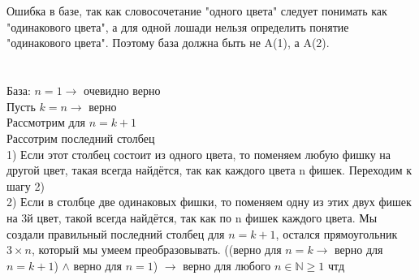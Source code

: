 \documentclass{article}
\begin{document}
\section{}

Ошибка в базе, так как словосочетание "одного цвета" следует понимать как "одинакового цвета", а для одной лошади нельзя определить понятие "одинакового цвета". Поэтому база должна быть не A(1), а A(2).


\section{}

База: $n = 1 \rightarrow $ очевидно верно\\
Пусть $k = n \rightarrow $ верно\\
Рассмотрим для $n = k+1$\\
Рассотрим последний столбец\\
1) Если этот столбец состоит из одного цвета, то поменяем любую фишку на другой цвет, такая всегда найдётся, так как каждого цвета n фишек. Переходим к шагу 2)\\
2) Если в столбце две одинаковых фишки, то поменяем одну из этих двух фишек на 3й цвет, такой всегда найдётся, так как по n фишек каждого цвета.
Мы создали правильный последний столбец для $n = k + 1$, остался прямоугольник $3 \times n$, который мы умеем преобразовывать.
((верно для $n = k \rightarrow$ верно для $n = k + 1$) $\wedge$ верно для $n = 1$) $\rightarrow$ верно для любого $n \in \mathbb{N} \geq 1$ чтд\\
\end{document}
